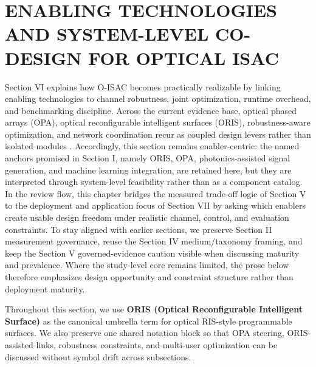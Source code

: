 \section{ENABLING TECHNOLOGIES AND SYSTEM-LEVEL CO-DESIGN FOR OPTICAL ISAC}

Section VI explains how O-ISAC becomes practically realizable by linking enabling technologies to channel robustness, joint optimization, runtime overhead, and benchmarking discipline. Across the current evidence base, optical phased arrays (OPA), optical reconfigurable intelligent surfaces (ORIS), robustness-aware optimization, and network coordination recur as coupled design levers rather than isolated modules \cite{O_ISAC_008,O_ISAC_023,O_ISAC_061,O_ISAC_091,O_ISAC_098,O_ISAC_112,O_ISAC_127}. Accordingly, this section remains enabler-centric: the named anchors promised in Section I, namely ORIS, OPA, photonics-assisted signal generation, and machine learning integration, are retained here, but they are interpreted through system-level feasibility rather than as a component catalog. In the review flow, this chapter bridges the measured trade-off logic of Section V to the deployment and application focus of Section VII by asking which enablers create usable design freedom under realistic channel, control, and evaluation constraints. To stay aligned with earlier sections, we preserve Section II measurement governance, reuse the Section IV medium/taxonomy framing, and keep the Section V governed-evidence caution visible when discussing maturity and prevalence. Where the study-level core remains limited, the prose below therefore emphasizes design opportunity and constraint structure rather than deployment maturity.

Throughout this section, we use \textbf{ORIS (Optical Reconfigurable Intelligent Surface)} as the canonical umbrella term for optical RIS-style programmable surfaces. We also preserve one shared notation block so that OPA steering, ORIS-assisted links, robustness constraints, and multi-user optimization can be discussed without symbol drift across subsections.

